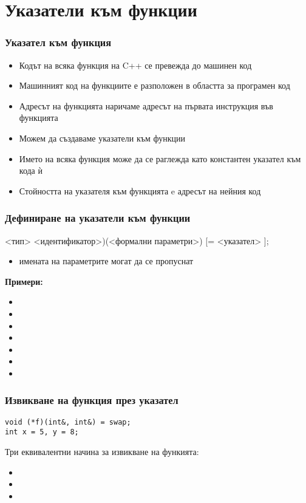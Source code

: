 \documentclass{beamer}
\begin{document}
\section{Указатели към функции}

\begin{frame}
  \frametitle{Указател към функция}

  \begin{itemize}[<+->]
  \item Кодът на всяка функция на C++ се превежда до машинен код
  \item Машинният код на функциите е разположен в областта за програмен код
  \item \alert{Адресът на функцията} наричаме адресът на първата инструкция във функцията
  \item Можем да създаваме \alert{указатели към функции}
  \item Името на всяка функция може да се раглежда като константен указател към кода ѝ
  \item Стойността на указателя към функцията e адресът на нейния код
  \end{itemize}
\end{frame}

\begin{frame}
  \frametitle{Дефиниране на указатели към функции}

  {\small
    <тип> \tta{(*}<идентификатор>\tta)\tta(<формални параметри>\tta) [\tta= <указател> ]\tta;}
  \pause
  \begin{itemize}
  \item имената на параметрите могат да се пропуснат
  \end{itemize}
  \pause
  \textbf{Примери:}
  \begin{itemize}[<+->]
  \item {}
  \item {}
  \item {}
  \item {}
  \item {}
  \item {}
  \item {}
  \end{itemize}
\end{frame}

\begin{frame}[fragile]
  \frametitle{Извикване на функция през указател}

\begin{lstlisting}
void (*f)(int&, int&) = swap;
int x = 5, y = 8;
\end{lstlisting}
  \pause
  Три еквивалентни начина за извикване на функията:
  \begin{itemize}
  \item {}
  \item {}
  \item {}
  \end{itemize}
\end{frame}
\end{document}
